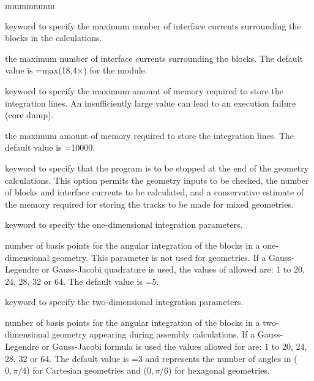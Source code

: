 \begin{ListeDeDescription}{mmmmmmm}

\item[\moc{MAXJ}] keyword to specify the maximum number of interface currents
surrounding the blocks in the calculations. 

\item[\dusa{maxcur}] the maximum number of interface currents surrounding the
blocks. The default value is =max(18,4$\times$) for the
 module.

\item[\moc{MAXZ}] keyword to specify the maximum amount of memory required to
store the integration lines. An insufficiently large value can lead to an
execution failure (core dump).

\item[\dusa{maxint}] the maximum amount of memory required to store the
integration lines. The default value is =10000.

\item[\moc{HALT}] keyword to specify that the program is to be stopped at the
end of the geometry calculations. This option permits the geometry inputs to be
checked, the number of blocks and interface currents to be calculated, and a
conservative estimate of the memory required for storing the tracks to be made
for mixed geometries.

\item[\moc{QUA1}] keyword to specify the one-dimensional integration
parameters.

\item[\dusa{iqua1}] number of basis points for the angular integration of the
blocks in a one-dimensional geometry. This parameter is not used for
 geometries. If a Gauss-Legendre or Gauss-Jacobi quadrature is used,
the values of  allowed are: 1 to 20, 24, 28, 32 or 64. The default
value is =5. 

\item[\moc{QUA2}] keyword to specify the two-dimensional integration
parameters.

\item[\dusa{iqua2}] number of basis points for the angular integration of the
blocks in a two-dimensional geometry appearing during assembly  
calculations. If a Gauss-Legendre or Gauss-Jacobi formula is used the values
allowed for  are: 1 to 20, 24, 28, 32 or 64. The default value is
=3 and represents the number of angles in ($0,\pi/4$) for
Cartesian geometries and  ($0,\pi/6$) for hexagonal geometries. 


\end{ListeDeDescription}
